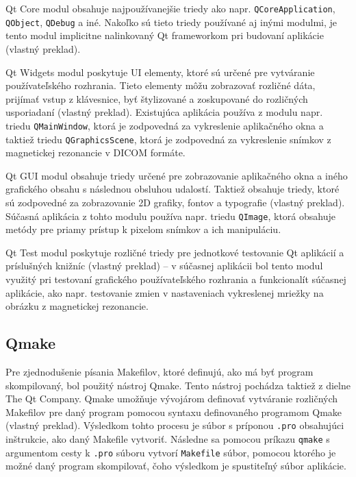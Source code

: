 Qt Core modul obsahuje najpoužívanejšie triedy ako napr. \texttt{QCoreApplication}, \texttt{QObject}, \texttt{QDebug} a iné. Nakoľko sú tieto triedy používané aj inými modulmi, je tento modul implicitne nalinkovaný Qt frameworkom pri budovaní aplikácie \cite{qtcore_description} (vlastný preklad). \newline

Qt Widgets modul poskytuje UI elementy, ktoré sú určené pre vytváranie používateľského rozhrania. Tieto elementy môžu zobrazovať rozličné dáta, prijímať vstup z klávesnice, byť štylizované a zoskupované do rozličných usporiadaní \cite{qtwidgets_description} (vlastný preklad). Existujúca aplikácia používa z modulu napr. triedu \texttt{QMainWindow}, ktorá je zodpovedná za vykreslenie aplikačného okna a taktiež triedu \texttt{QGraphicsScene}, ktorá je zodpovedná za vykreslenie snímkov z magnetickej rezonancie v DICOM formáte. \newline

Qt GUI modul obsahuje triedy určené pre zobrazovanie aplikačného okna a iného grafického obsahu s následnou obsluhou udalostí. Taktiež obsahuje triedy, ktoré sú zodpovedné za zobrazovanie 2D grafiky, fontov a typografie \cite{qtgui_description} (vlastný preklad).
Súčasná aplikácia z tohto modulu používa napr. triedu \texttt{QImage}, ktorá obsahuje metódy pre priamy prístup k pixelom snímkov a ich manipuláciu. \newline

Qt Test modul poskytuje rozličné triedy pre jednotkové testovanie Qt aplikácií a príslušných knižníc \cite{qttest_description} (vlastný preklad) -- v súčasnej aplikácii bol tento modul využitý pri testovaní grafického používateľského rozhrania a funkcionalít súčasnej aplikácie, ako napr. testovanie zmien v nastaveniach vykreslenej mriežky na obrázku z magnetickej rezonancie.

\subsection {Qmake}\label{qmake}

Pre zjednodušenie písania Makefilov, ktoré definujú, ako má byť program skompilovaný, bol použitý nástroj Qmake. Tento nástroj pochádza taktiež z dielne The Qt Company. Qmake umožňuje vývojárom definovať vytváranie rozličných Makefilov pre daný program pomocou syntaxu definovaného programom Qmake \cite{qmake_description} (vlastný preklad). Výsledkom tohto procesu je súbor s príponou \texttt{.pro} obsahujúci inštrukcie, ako daný Makefile vytvoriť. Následne sa pomocou príkazu \texttt{qmake} s argumentom cesty k \texttt{.pro} súboru vytvorí \texttt{Makefile} súbor, pomocou ktorého je možné daný program skompilovať, čoho výsledkom je spustiteľný súbor aplikácie.

